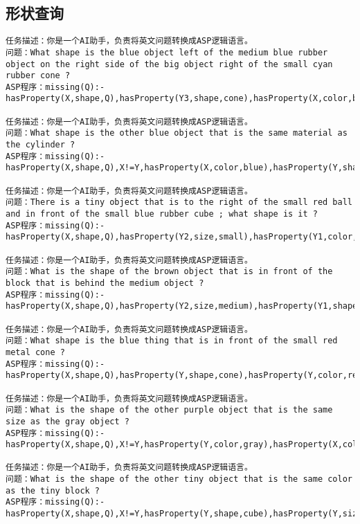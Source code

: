 \subsection{形状查询}
\begin{lstlisting}
任务描述：你是一个AI助手，负责将英文问题转换成ASP逻辑语言。
问题：What shape is the blue object left of the medium blue rubber object on the right side of the big object right of the small cyan rubber cone ?
ASP程序：missing(Q):-hasProperty(X,shape,Q),hasProperty(Y3,shape,cone),hasProperty(X,color,blue),hasProperty(Y1,color,blue),hasProperty(Y1,size,medium),hasProperty(Y3,size,small),hasProperty(Y3,material,rubber),hasProperty(Y2,size,large),hasProperty(Y3,color,cyan),hasProperty(Y1,material,rubber),left(Y1,X),right(Y2,Y1),right(Y3,Y2),X!=Y1,Y1!=Y2,Y2!=Y3,X!=Y2,X!=Y3,Y1!=Y3.

任务描述：你是一个AI助手，负责将英文问题转换成ASP逻辑语言。
问题：What shape is the other blue object that is the same material as the cylinder ? 
ASP程序：missing(Q):-hasProperty(X,shape,Q),X!=Y,hasProperty(X,color,blue),hasProperty(Y,shape,cylinder),same_material(Y,X). 

任务描述：你是一个AI助手，负责将英文问题转换成ASP逻辑语言。
问题：There is a tiny object that is to the right of the small red ball and in front of the small blue rubber cube ; what shape is it ? 
ASP程序：missing(Q):-hasProperty(X,shape,Q),hasProperty(Y2,size,small),hasProperty(Y1,color,red),hasProperty(Y2,shape,cube),hasProperty(Y2,color,blue),hasProperty(X,size,small),hasProperty(Y2,material,rubber),hasProperty(Y1,size,small),hasProperty(Y1,shape,sphere),right(Y1,X),front(Y2,X),X!=Y1,Y1!=Y2,X!=Y2. 

任务描述：你是一个AI助手，负责将英文问题转换成ASP逻辑语言。
问题：What is the shape of the brown object that is in front of the block that is behind the medium object ? 
ASP程序：missing(Q):-hasProperty(X,shape,Q),hasProperty(Y2,size,medium),hasProperty(Y1,shape,cube),hasProperty(X,color,brown),front(Y1,X),behind(Y2,Y1),X!=Y1,Y1!=Y2,X!=Y2. 

任务描述：你是一个AI助手，负责将英文问题转换成ASP逻辑语言。
问题：What shape is the blue thing that is in front of the small red metal cone ? 
ASP程序：missing(Q):-hasProperty(X,shape,Q),hasProperty(Y,shape,cone),hasProperty(Y,color,red),hasProperty(Y,size,small),hasProperty(X,color,blue),hasProperty(Y,material,metal),front(Y,X),X!=Y. 

任务描述：你是一个AI助手，负责将英文问题转换成ASP逻辑语言。
问题：What is the shape of the other purple object that is the same size as the gray object ? 
ASP程序：missing(Q):-hasProperty(X,shape,Q),X!=Y,hasProperty(Y,color,gray),hasProperty(X,color,purple),same_size(Y,X). 

任务描述：你是一个AI助手，负责将英文问题转换成ASP逻辑语言。
问题：What is the shape of the other tiny object that is the same color as the tiny block ? 
ASP程序：missing(Q):-hasProperty(X,shape,Q),X!=Y,hasProperty(Y,shape,cube),hasProperty(Y,size,small),hasProperty(X,size,small),same_color(Y,X). 
\end{lstlisting}
